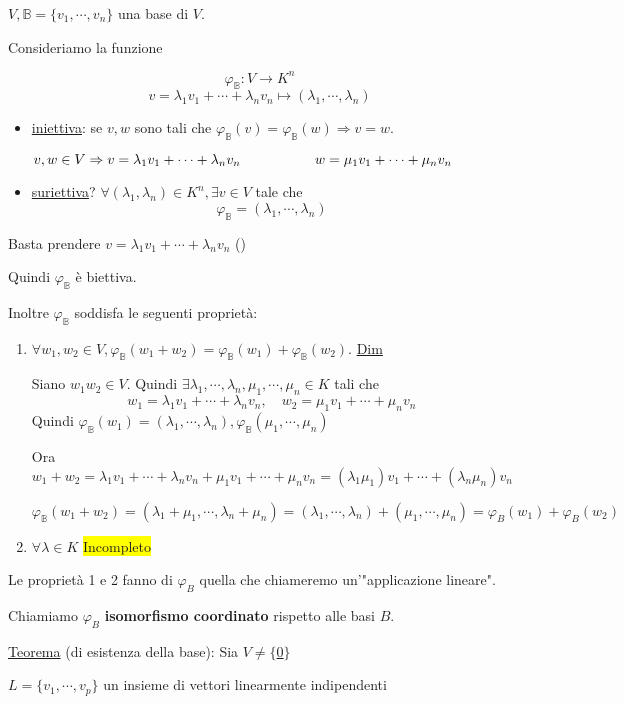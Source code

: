 \documentclass{article}
\newcommand{\hl}[1]{\colorbox{yellow}{#1}}
\newcommand{\ul}[1]{\underline{#1}}
\newcommand{\B}{\mathbb{B}}
\begin{document}
$V,\B=\{v_1,\cdots,v_n\}$ una base di $V$.

	Consideriamo la funzione

	$$\varphi_\B:V\rightarrow K^n$$
	$$v=\lambda_1v_1+\cdots+\lambda_nv_n\mapsto(\lambda_1,\cdots,\lambda_n)$$
	\begin{itemize}
		\item \ul{iniettiva}: se $v,w$ sono tali che $\varphi_\B(v)=\varphi_\B(w)\Rightarrow v=w$.

		      $v,w\in V\Rightarrow v=\lambda_1v_1+\cdots+\lambda_nv_n\\\qquad\qquad\quad\ w=\mu_1v_1+\cdots+\mu_nv_n$
		\item \ul{suriettiva}? $\forall(\lambda_1,\lambda_n)\in K^n,\exists v\in V$ tale che
		      $$\varphi_\B=(\lambda_1,\cdots,\lambda_n)$$
	\end{itemize}
	Basta prendere $v=\lambda_1v_1+\cdots+\lambda_nv_n$ (\boxed)

	Quindi $\varphi_\B$ è biettiva.

	Inoltre $\varphi_\B$ soddisfa le seguenti proprietà:
	\begin{enumerate}
		\item $\forall w_1,w_2\in V,\varphi_\B(w_1+w_2)=\varphi_\B(w_1)+\varphi_\B(w_2)$.
		      \ul{Dim}

		      Siano $w_1w_2\in V$. Quindi $\exists\lambda_1,\cdots,\lambda_n,\mu_1,\cdots,\mu_n\in K$ tali che
		      $$w_1=\lambda_1v_1+\cdots+\lambda_nv_n,\quad w_2=\mu_1v_1+\cdots+\mu_nv_n$$
		      Quindi $\varphi_\B(w_1)=(\lambda_1,\cdots,\lambda_n),\varphi_\B(\mu_1,\cdots,\mu_n)$

		      Ora $w_1+w_2=\lambda_1v_1+\cdots+\lambda_nv_n+\mu_1v_1+\cdots+\mu_nv_n=(\lambda_1\mu_1)v_1+\cdots+(\lambda_n\mu_n)v_n$

		      $\varphi_\B(w_1+w_2)=(\lambda_1+\mu_1,\cdots,\lambda_n+\mu_n)=(\lambda_1,\cdots,\lambda_n)+(\mu_1,\cdots,\mu_n)=\varphi_B(w_1)+\varphi_B(w_2)$
		\item $\forall\lambda\in K$ \hl{Incompleto}
	\end{enumerate}

	Le proprietà 1 e 2 fanno di $\varphi_B$ quella che chiameremo un'"applicazione lineare".

	Chiamiamo $\varphi_B$ \textbf{isomorfismo coordinato} rispetto alle basi $B$.

	\ul{Teorema} (di esistenza della base): Sia $V\not=\{$\ul{0}$\}$

$L=\{v_1,\cdots,v_p\}$ un insieme di vettori linearmente indipendenti
\end{document}
